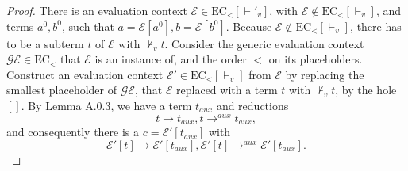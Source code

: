 \compl*
\begin{proof}

There is an evaluation context $\mathcal{E} \in \textrm{EC}_<[\vdash'_v]$, with $\mathcal{E} \not\in \textrm{EC}_<[\vdash_v]$, and terms $a^0, b^0$, such that $a = \mathcal{E}[a^0], b = \mathcal{E}[b^0]$. Because $\mathcal{E} \not\in \textrm{EC}_<[\vdash_v]$, there has to be a subterm $t$ of $\mathcal{E}$ with $\not\vdash_v t$. Consider the generic evaluation context $\mathcal{GE} \in \textrm{EC}_<$ that $\mathcal{E}$ is an instance of, and the order $<$ on its placeholders. Construct an evaluation context $\mathcal{E}' \in \textrm{EC}_<[\vdash_v]$ from $\mathcal{E}$ by replacing the smallest placeholder of $\mathcal{GE}$, that $\mathcal{E}$ replaced with a term $t$ with $\not\vdash_v t$, by the hole $[]$. By Lemma A.0.3, we have a term $t_{aux}$ and reductions
\[
t \longrightarrow t_{aux}, t \longrightarrow^{aux} t_{aux},
\]
and consequently there is a $c = \mathcal{E}'[t_{aux}]$ with
\[
\mathcal{E}'[t] \longrightarrow \mathcal{E}'[t_{aux}], \mathcal{E}'[t] \longrightarrow^{aux} \mathcal{E}'[t_{aux}].
\]

\end{proof}

